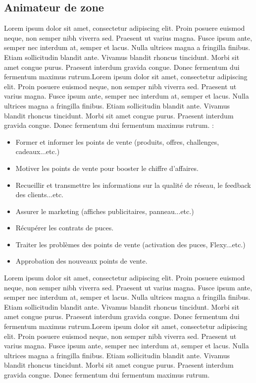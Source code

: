 \subsection{Animateur de zone}

Lorem ipsum dolor sit amet, consectetur adipiscing elit. Proin posuere euismod neque, non semper nibh viverra sed. Praesent ut varius magna. Fusce ipsum ante, semper nec interdum at, semper et lacus. Nulla ultrices magna a fringilla finibus. Etiam sollicitudin blandit ante. Vivamus blandit rhoncus tincidunt. Morbi sit amet congue purus. Praesent interdum gravida congue. Donec fermentum dui fermentum maximus rutrum.Lorem ipsum dolor sit amet, consectetur adipiscing elit. Proin posuere euismod neque, non semper nibh viverra sed. Praesent ut varius magna. Fusce ipsum ante, semper nec interdum at, semper et lacus. Nulla ultrices magna a fringilla finibus. Etiam sollicitudin blandit ante. Vivamus blandit rhoncus tincidunt. Morbi sit amet congue purus. Praesent interdum gravida congue. Donec fermentum dui fermentum maximus rutrum. :

\medskip

\begin{itemize}
    \item Former et informer les points de vente (produits, offres, challenges, cadeaux...etc.)
    \item Motiver les points de vente pour booster le chiffre d'affaires.
    \item Recueillir et transmettre les informations sur la qualité de réseau, le feedback des clients...etc.
    \item Assurer le marketing (affiches publicitaires, panneau...etc.)
    \item Récupérer les contrats de puces.
    \item Traiter les problèmes des points de vente (activation des puces, Flexy...etc.)
    \item Approbation des nouveaux points de vente.
\end{itemize}

Lorem ipsum dolor sit amet, consectetur adipiscing elit. Proin posuere euismod neque, non semper nibh viverra sed. Praesent ut varius magna. Fusce ipsum ante, semper nec interdum at, semper et lacus. Nulla ultrices magna a fringilla finibus. Etiam sollicitudin blandit ante. Vivamus blandit rhoncus tincidunt. Morbi sit amet congue purus. Praesent interdum gravida congue. Donec fermentum dui fermentum maximus rutrum.Lorem ipsum dolor sit amet, consectetur adipiscing elit. Proin posuere euismod neque, non semper nibh viverra sed. Praesent ut varius magna. Fusce ipsum ante, semper nec interdum at, semper et lacus. Nulla ultrices magna a fringilla finibus. Etiam sollicitudin blandit ante. Vivamus blandit rhoncus tincidunt. Morbi sit amet congue purus. Praesent interdum gravida congue. Donec fermentum dui fermentum maximus rutrum.

